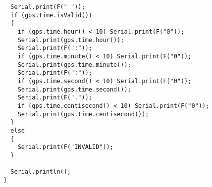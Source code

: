 \begin{verbatim}
  Serial.print(F(" "));
  if (gps.time.isValid())
  {
    if (gps.time.hour() < 10) Serial.print(F("0"));
    Serial.print(gps.time.hour());
    Serial.print(F(":"));
    if (gps.time.minute() < 10) Serial.print(F("0"));
    Serial.print(gps.time.minute());
    Serial.print(F(":"));
    if (gps.time.second() < 10) Serial.print(F("0"));
    Serial.print(gps.time.second());
    Serial.print(F("."));
    if (gps.time.centisecond() < 10) Serial.print(F("0"));
    Serial.print(gps.time.centisecond());
  }
  else
  {
    Serial.print(F("INVALID"));
  }

  Serial.println();
}
\end{verbatim}